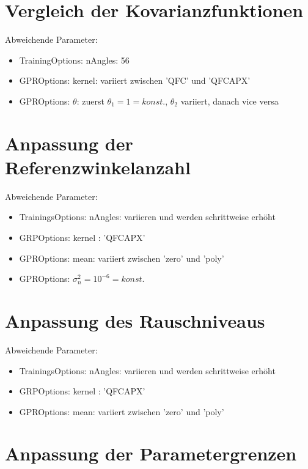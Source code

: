 \section{Vergleich der Kovarianzfunktionen}\label{sec:paramexp1}


Abweichende Parameter:

\begin{itemize}
	\item TrainingOptions: nAngles: 56
	\item GPROptions: kernel: variiert zwischen 'QFC' und 'QFCAPX'
	\item GPROptions: $\theta$: zuerst $\theta_1 = 1 = konst.$, $\theta_2$ variiert, danach vice versa 
\end{itemize}


\section{Anpassung der Referenzwinkelanzahl}\label{sec:paramexp2}


Abweichende Parameter:

\begin{itemize}
	\item TrainingsOptions: nAngles: variieren und werden schrittweise erhöht
	\item GRPOptions: kernel : 'QFCAPX'
	\item GPROptions: mean: variiert zwischen 'zero' und 'poly'
	\item GPROptions: $\sigma_n^2 = 10^{-6} = konst.$
\end{itemize}


\section{Anpassung des Rauschniveaus}\label{sec:paramexp3}


Abweichende Parameter:

\begin{itemize}
	\item TrainingsOptions: nAngles: variieren und werden schrittweise erhöht
	\item GRPOptions: kernel : 'QFCAPX'
	\item GPROptions: mean: variiert zwischen 'zero' und 'poly'
\end{itemize}


\section{Anpassung der Parametergrenzen}\label{sec:paramexp4}


